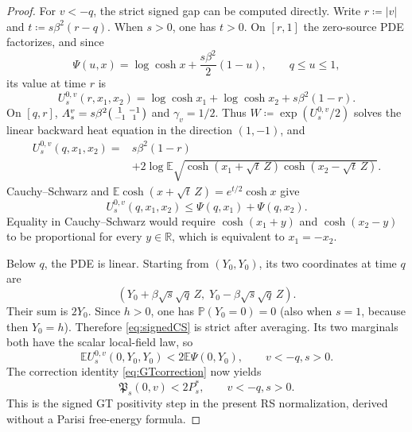 \documentclass[11pt]{article}
\numberwithin{equation}{section}
\newcommand{\E}{\mathbb{E}}
\newcommand{\1}{\mathbf 1}
\begin{document}
\begin{proof}
For $v<-q$, the strict signed gap can be computed directly.  Write
$r\coloneqq|v|$ and $t\coloneqq s\beta^2(r-q)$.  When $s>0$, one has
$t>0$.
On $[r,1]$
the zero-source PDE factorizes, and since
\[
 \Psi(u,x)=\log\cosh x+\frac{s\beta^2}{2}(1-u),
 \qquad q\le u\le1,
\]
its value at time $r$ is
\[
 U_s^{0,v}(r,x_1,x_2)
 =\log\cosh x_1+\log\cosh x_2+s\beta^2(1-r).
\]
On $[q,r]$,
$A_s^v=s\beta^2\begin{psmallmatrix}1&-1\\-1&1\end{psmallmatrix}$
and $\gamma_v=1/2$.  Thus $W\coloneqq\exp(U_s^{0,v}/2)$ solves the linear
backward heat equation in the direction $(1,-1)$, and
\begin{align}
 U_s^{0,v}(q,x_1,x_2)
 ={}&s\beta^2(1-r)\nonumber\\
 &+2\log\E\sqrt{
   \cosh(x_1+\sqrt t\,Z)\cosh(x_2-\sqrt t\,Z)}.
 \label{eq:signedhopfcole}
\end{align}
Cauchy--Schwarz and
$\E\cosh(x+\sqrt t\,Z)=e^{t/2}\cosh x$ give
\begin{equation}
 U_s^{0,v}(q,x_1,x_2)
 \le \Psi(q,x_1)+\Psi(q,x_2).
 \label{eq:signedCS}
\end{equation}
Equality in Cauchy--Schwarz would require
$\cosh(x_1+y)$ and $\cosh(x_2-y)$ to be proportional for every
$y\in\mathbb R$, which is equivalent to $x_1=-x_2$.

Below $q$, the PDE is linear.  Starting from $(Y_0,Y_0)$, its two
coordinates at time $q$ are
\[
 (Y_0+\beta\sqrt{s}\sqrt q\,Z,\;
  Y_0-\beta\sqrt{s}\sqrt q\,Z).
\]
Their sum is $2Y_0$.  Since $h>0$, one has
$\mathbb P(Y_0=0)=0$ (also when $s=1$, because then $Y_0=h$).
Therefore \eqref{eq:signedCS} is strict after averaging.  Its two
marginals both have the scalar local-field law, so
\begin{equation}
 \E U_s^{0,v}(0,Y_0,Y_0)<2\E\Psi(0,Y_0),
 \qquad v<-q, s>0.
 \label{eq:signedstrictPDE}
\end{equation}
The correction identity \eqref{eq:GTcorrection} now yields
\begin{equation}
 \mathfrak P_s(0,v)<2P_s^*,
 \qquad v<-q, s>0.
 \label{eq:signedpositivity}
\end{equation}
This is the signed GT positivity step in the present RS
normalization, derived without a Parisi free-energy formula.


\end{proof}
\end{document}
